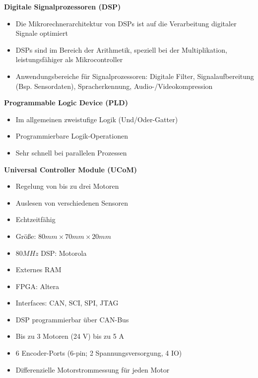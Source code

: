 \textbf{Digitale Signalprozessoren (DSP)}
\begin{itemize}
\item Die Mikrorechnerarchitektur von DSPs ist auf die Verarbeitung digitaler Signale optimiert
\item DSPs sind im Bereich der Arithmetik, speziell bei der Multiplikation, leistungsfähiger als Mikrocontroller
\item Anwendungsbereiche für Signalprozessoren: Digitale Filter, Signalaufbereitung (Bsp. Sensordaten), Spracherkennung, Audio-/Videokompression
\end{itemize}

\textbf{Programmable Logic Device (PLD)}
\begin{itemize}
\item Im allgemeinen zweistufige Logik (Und/Oder-Gatter)
\item Programmierbare Logik-Operationen
\item Sehr schnell bei parallelen Prozessen
\end{itemize}

\textbf{Universal Controller Module (UCoM)}
\begin{itemize}
\item Regelung von bis zu drei Motoren
\item Auslesen von verschiedenen Sensoren
\item Echtzeitfähig
\item Größe: $80mm \times 70mm \times 20mm$
\item $80MHz$ DSP: Motorola
\item Externes RAM
\item FPGA: Altera
\item Interfaces: CAN, SCI, SPI, JTAG
\item DSP programmierbar über CAN-Bus
\item Bis zu 3 Motoren (24 V) bis zu 5 A
\item 6 Encoder-Ports (6-pin; 2 Spannungsversorgung, 4 IO)
\item Differenzielle Motorstrommessung für jeden Motor
\end{itemize}

